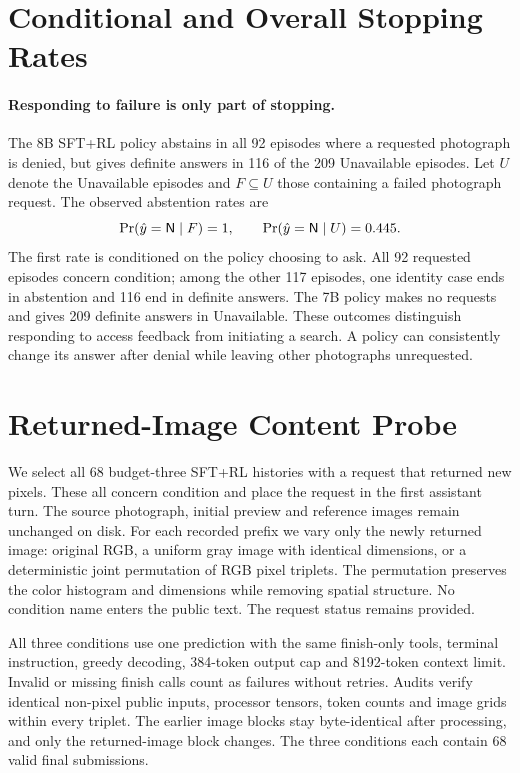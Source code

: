 \section{Conditional and Overall Stopping Rates}
\paragraph{Responding to failure is only part of stopping.}

The 8B SFT+RL policy abstains in all 92 episodes where a requested photograph is denied, but gives definite answers in 116 of the 209 Unavailable episodes.
Let \(U\) denote the Unavailable episodes and \(F\subseteq U\) those containing a failed photograph request.
The observed abstention rates are
\begin{equation}
\Pr(\hat y=\mathsf{N}\mid F)=1,\qquad
\Pr(\hat y=\mathsf{N}\mid U)=0.445.
\label{eq:failed-request}
\end{equation}
The first rate is conditioned on the policy choosing to ask.
All 92 requested episodes concern condition; among the other 117 episodes, one identity case ends in abstention and 116 end in definite answers.
The 7B policy makes no requests and gives 209 definite answers in Unavailable.
These outcomes distinguish responding to access feedback from initiating a search.
A policy can consistently change its answer after denial while leaving other photographs unrequested.

\section{Returned-Image Content Probe}
We select all 68 budget-three SFT+RL histories with a request that returned new pixels.
These all concern condition and place the request in the first assistant turn.
The source photograph, initial preview and reference images remain unchanged on disk.
For each recorded prefix we vary only the newly returned image: original RGB, a uniform gray image with identical dimensions, or a deterministic joint permutation of RGB pixel triplets.
The permutation preserves the color histogram and dimensions while removing spatial structure.
No condition name enters the public text.
The request status remains provided.

All three conditions use one prediction with the same finish-only tools, terminal instruction, greedy decoding, 384-token output cap and 8192-token context limit.
Invalid or missing finish calls count as failures without retries.
Audits verify identical non-pixel public inputs, processor tensors, token counts and image grids within every triplet.
The earlier image blocks stay byte-identical after processing, and only the returned-image block changes.
The three conditions each contain 68 valid final submissions.

